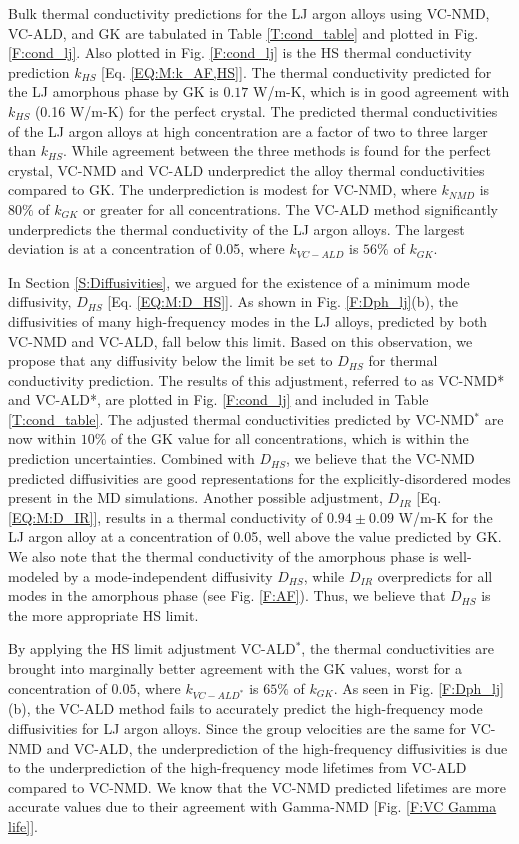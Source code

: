 \documentclass[12pt,twocolumn,iop]{/usr/share/texmf/tex/latex/iop/iopart}[/usr/share/texmf/tex/latex/iop/]
\begin{document}
Bulk thermal conductivity predictions for the LJ argon alloys using  
VC-NMD, VC-ALD, and GK are tabulated in Table \ref{T:cond_table} 
and plotted in Fig. \ref{F:cond_lj}. Also plotted 
in Fig. \ref{F:cond_lj} is the HS  
thermal conductivity prediction $k_{HS}$ 
[Eq. \eqref{EQ:M:k_AF,HS}]. The thermal conductivity predicted 
for the LJ amorphous phase by GK is $0.17$ W/m-K,  
which is in good agreement with $k_{HS}$ (0.16 W/m-K) for the 
perfect crystal.  
The predicted thermal conductivities of the LJ argon alloys at high 
concentration are a factor of two to three larger than $k_{HS}$.  
While agreement between the three methods is found for the perfect 
crystal, VC-NMD and VC-ALD underpredict the alloy thermal 
conductivities compared to GK. 
The underprediction is modest for VC-NMD, where $k_{NMD}$ is 
$80\%$ of $k_{GK}$ or greater for all concentrations. The VC-ALD method 
significantly underpredicts the thermal conductivity of the LJ argon alloys. 
The largest deviation is at a concentration of 0.05, where 
$k_{VC-ALD}$ is $56\%$ of $k_{GK}$.

In Section \ref{S:Diffusivities}, 
we argued for the existence of a minimum mode 
diffusivity, $D_{HS}$ [Eq. \eqref{EQ:M:D_HS}]. 
As shown in Fig. \ref{F:Dph_lj}(b), the diffusivities of 
many high-frequency modes in the LJ alloys, predicted by both VC-NMD 
and VC-ALD, fall below this limit.  Based on this observation, we propose 
that any diffusivity below the limit be set to $D_{HS}$ 
for thermal conductivity prediction. 
The results of this adjustment, 
referred to as VC-NMD* and VC-ALD*, are plotted in Fig. \ref{F:cond_lj} 
and included in Table \ref{T:cond_table}.  
The adjusted thermal conductivities predicted by VC-NMD$^*$ are now  
within $10\%$ of the GK value for all concentrations, which
is within the prediction uncertainties. 
Combined with $D_{HS}$, we believe that the VC-NMD predicted 
diffusivities are good representations for the explicitly-disordered 
modes present in the MD simulations. Another possible 
adjustment, $D_{IR}$ [Eq. \eqref{EQ:M:D_IR}], results in a thermal 
conductivity of $0.94 \pm 0.09$ W/m-K for the LJ argon alloy at a 
concentration of 0.05, well above the value predicted by GK. 
We also note that the thermal 
conductivity of the amorphous phase is well-modeled by a mode-independent 
diffusivity $D_{HS}$, while $D_{IR}$ overpredicts for all modes in the 
amorphous phase (see Fig. \ref{F:AF}). 
Thus, we believe that $D_{HS}$ is the more appropriate HS limit. 

By applying the HS limit adjustment VC-ALD$^*$, the thermal 
conductivities are brought into marginally better agreement with 
the GK values, worst for a concentration of $0.05$, where 
$k_{VC-ALD^*}$ is $65\%$ of $ k_{GK}$.  
As seen in Fig. \ref{F:Dph_lj}(b), the VC-ALD method fails to 
accurately predict the high-frequency mode diffusivities for 
LJ argon alloys. Since the group velocities are the same for 
VC-NMD and VC-ALD, the underprediction of the high-frequency 
diffusivities is
due to the underprediction of the high-frequency 
mode lifetimes from VC-ALD compared to VC-NMD. We know that the 
VC-NMD predicted lifetimes are more accurate values due 
to their agreement with Gamma-NMD [Fig. \ref{F:VC Gamma life}]. 
\end{document}
